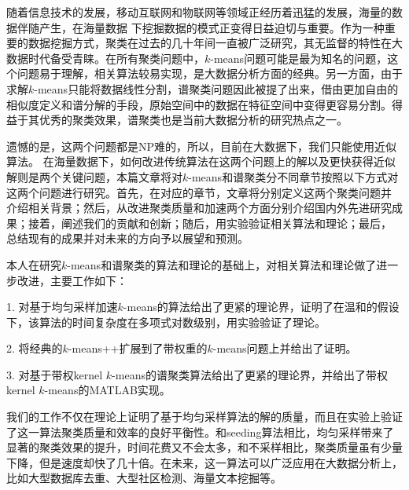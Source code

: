 	
\begin{chineseabstract}
随着信息技术的发展，移动互联网和物联网等领域正经历着迅猛的发展，海量的数据伴随产生，在海量数据
下挖掘数据的模式正变得日益迫切与重要。作为一种重要的数据挖掘方式，聚类在过去的几十年间一直被广泛研究，其无监督的特性在大数据时代备受青睐。在所有聚类问题中，$k$-means问题可能是最为知名的问题，这个问题易于理解，相关算法较易实现，是大数据分析方面的经典。另一方面，由于求解$k$-means只能将数据线性分割，谱聚类问题因此被提了出来，借由更加自由的相似度定义和谱分解的手段，原始空间中的数据在特征空间中变得更容易分割。得益于其优秀的聚类效果，谱聚类也是当前大数据分析的研究热点之一。

遗憾的是，这两个问题都是NP难的，所以，目前在大数据下，我们只能使用近似算法。
在海量数据下，如何改进传统算法在这两个问题上的解以及更快获得近似解则是两个关键问题，本篇文章将对$k$-means和谱聚类分不同章节按照以下方式对这两个问题进行研究。首先，在对应的章节，文章将分别定义这两个聚类问题并
介绍相关背景；然后，从改进聚类质量和加速两个方面分别介绍国内外先进研究成果；接着，阐述我们的贡献和创新；随后，用实验验证相关算法和理论；最后， 总结现有的成果并对未来的方向予以展望和预测。

本人在研究$k$-means和谱聚类的算法和理论的基础上，对相关算法和理论做了进一步改进，主要工作如下：

1. 对基于均匀采样加速$k$-means的算法给出了更紧的理论界，证明了在温和的假设下，该算法的时间复杂度在多项式对数级别，用实验验证了理论。

2. 将经典的$k$-means++扩展到了带权重的$k$-means问题上并给出了证明。

3. 对基于带权kernel $k$-means的谱聚类算法给出了更紧的理论界，并给出了带权kernel $k$-means的MATLAB实现。

我们的工作不仅在理论上证明了基于均匀采样算法的解的质量，而且在实验上验证了这一算法聚类质量和效率的良好平衡性。和seeding算法相比，均匀采样带来了显著的聚类效果的提升，时间花费又不会太多，和不采样相比，聚类质量虽有少量下降，但是速度却快了几十倍。在未来，这一算法可以广泛应用在大数据分析上，比如大型数据库去重、大型社区检测、海量文本挖掘等。

\end{chineseabstract}


